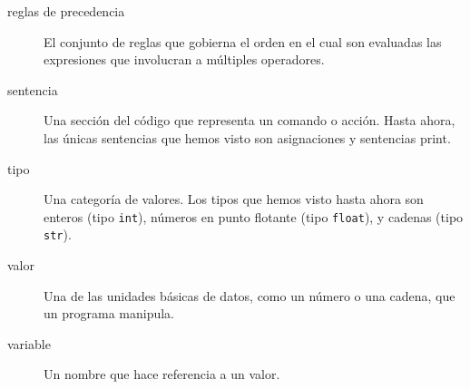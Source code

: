 
\begin{description}
\item[reglas de precedencia]
El conjunto de reglas que gobierna el orden en el cual son evaluadas las
expresiones que involucran a múltiples operadores.
\end{description}

 

\begin{description}
\item[sentencia]
Una sección del código que representa un comando o acción. Hasta ahora,
las únicas sentencias que hemos visto son asignaciones y sentencias
print.
\end{description}


\begin{description}
\item[tipo]
Una categoría de valores. Los tipos que hemos visto hasta ahora son
enteros (tipo \texttt{int}), números en punto flotante (tipo
\texttt{float}), y cadenas (tipo \texttt{str}).
\end{description}


\begin{description}
\item[valor]
Una de las unidades básicas de datos, como un número o una cadena, que
un programa manipula.
\end{description}


\begin{description}
\item[variable]
Un nombre que hace referencia a un valor.
\end{description}

